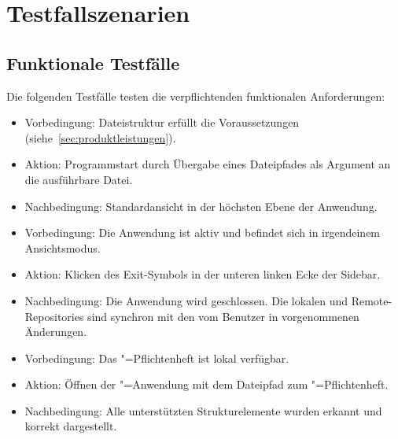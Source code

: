 \clearpage

\section{Testfallszenarien}
\label{sec:testfallszenarien}
\subsection{Funktionale Testfälle}
\label{subsec:funktionale-testfaelle}
Die folgenden Testfälle testen die verpflichtenden funktionalen Anforderungen:


\begin{itemize}
\item Vorbedingung: Dateistruktur erfüllt die Voraussetzungen (siehe~\ref{sec:produktleistungen}).
  \item Aktion: Programmstart durch Übergabe eines Dateipfades als Argument an die ausführbare Datei.
  \item Nachbedingung: Standardansicht in der höchsten Ebene der Anwendung.

\end{itemize}


\begin{itemize}
\item Vorbedingung: Die Anwendung ist aktiv und befindet sich in irgendeinem Ansichtsmodus.
  \item Aktion: Klicken des Exit-Symbols in der unteren linken Ecke der Sidebar.
  \item Nachbedingung: Die Anwendung wird geschlossen.
  Die lokalen und Remote-Repositories sind synchron mit den vom Benutzer in \texla{} vorgenommenen Änderungen.

\end{itemize}

\begin{itemize}
\item Vorbedingung: Das \texla"=Pflichtenheft ist lokal verfügbar.
  \item Aktion: Öffnen der \texla"=Anwendung mit dem Dateipfad zum \texla"=Pflichtenheft.
  \item Nachbedingung: Alle unterstützten Strukturelemente wurden erkannt und korrekt dargestellt.

\end{itemize}
\clearpage

